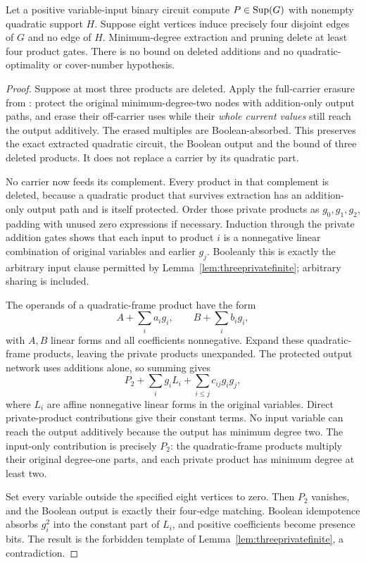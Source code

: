 \begin{proposition}\label{prop:fourprivateproducts}
Let a positive variable-input binary circuit compute $P\in\operatorname{Sup}(G)$ with nonempty quadratic support $H$. Suppose eight vertices induce precisely four disjoint edges of $G$ and no edge of $H$. Minimum-degree extraction and pruning delete at least four product gates. There is no bound on deleted additions and no quadratic-optimality or cover-number hypothesis.
\end{proposition}
\begin{proof}
Suppose at most three products are deleted. Apply the full-carrier erasure from \citet[proof of Lemma~5.26, first three paragraphs]{Companion}: protect the original minimum-degree-two nodes with addition-only output paths, and erase their off-carrier uses while their \emph{whole current values} still reach the output additively. The erased multiples are Boolean-absorbed. This preserves the exact extracted quadratic circuit, the Boolean output and the bound of three deleted products. It does not replace a carrier by its quadratic part.

No carrier now feeds its complement. Every product in that complement is deleted, because a quadratic product that survives extraction has an addition-only output path and is itself protected. Order those private products as $g_0,g_1,g_2$, padding with unused zero expressions if necessary. Induction through the private addition gates shows that each input to product $i$ is a nonnegative linear combination of original variables and earlier $g_j$. Booleanly this is exactly the arbitrary input clause permitted by Lemma~\ref{lem:threeprivatefinite}; arbitrary sharing is included.

The operands of a quadratic-frame product have the form
\[
 A+\sum_i a_i g_i,\qquad B+\sum_i b_i g_i,
\]
with $A,B$ linear forms and all coefficients nonnegative. Expand these quadratic-frame products, leaving the private products unexpanded. The protected output network uses additions alone, so summing gives
\[
 P_2+\sum_i g_iL_i+\sum_{i\leq j}c_{ij}g_ig_j,
\]
where $L_i$ are affine nonnegative linear forms in the original variables. Direct private-product contributions give their constant terms. No input variable can reach the output additively because the output has minimum degree two. The input-only contribution is precisely $P_2$: the quadratic-frame products multiply their original degree-one parts, and each private product has minimum degree at least two.

Set every variable outside the specified eight vertices to zero. Then $P_2$ vanishes, and the Boolean output is exactly their four-edge matching. Boolean idempotence absorbs $g_i^2$ into the constant part of $L_i$, and positive coefficients become presence bits. The result is the forbidden template of Lemma~\ref{lem:threeprivatefinite}, a contradiction.
\end{proof}

